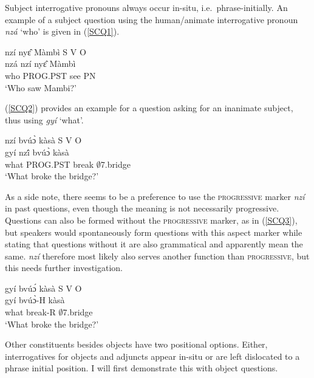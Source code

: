 Subject interrogative pronouns always occur in-situ, i.e.\ phrase-initially. An example of a subject question using the human/animate interrogative pronoun {\itshape nzá}  `who' is given in (\ref{SCQ1}).


\begin{exe}
\ex\label{SCQ1}
   nzí nyɛ̂ Màmbì \hfill S V O\\
             nzá nzí nyɛ̂ Màmbì \\
               who PROG.PST see PN\\
    \trans `Who saw Mambi?'
\end {exe}

\noindent (\ref{SCQ2}) provides an example for a question asking for an inanimate subject, thus using {\itshape gyí} `what'.

\begin{exe}
\ex\label{SCQ2}
  nzí bvúɔ̀ kàsà \hfill S V O\\
           gyí nzî́ bvúɔ̀ kàsà\\
             what PROG.PST break $\emptyset$7.bridge  \\
    \trans `What broke the bridge?'
\end{exe}

As a side note, there seems to be a  preference to use the \textsc{progressive} marker {\itshape nzí} in past questions, even though the meaning is not necessarily progressive. Questions can also be formed without the \textsc{progressive} marker, as in (\ref{SCQ3}), but speakers would spontaneously form questions with this aspect marker while stating that questions without it are also grammatical and apparently mean the same. {\itshape nzí} therefore most likely also serves another function than \textsc{progressive}, but this needs further investigation.


\begin{exe}
\ex\label{SCQ3}
  \glll  gyí bvúɔ́ kàsà  \hfill S V O\\
            gyí bvúɔ̀-H kàsà \\
              what break-R $\emptyset$7.bridge\\
    \trans `What broke the bridge?'
\end{exe}

Other constituents besides objects have two positional options. Either, interrogatives for objects and adjuncts appear in-situ or are left dislocated to a phrase initial position. I will first demonstrate this with object questions.


